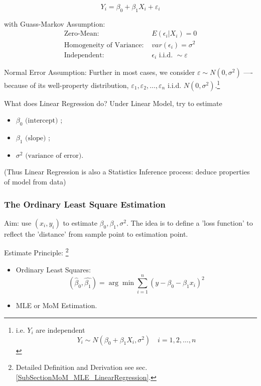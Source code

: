     \begin{equation}
        Y_i=\beta _0+\beta _1X_i+\varepsilon _i 
    \end{equation}

    with Guass-Markov Assumption:
    \begin{equation}\label{EqaGaussMarkovAssumption}
        \begin{aligned}
            \text{Zero-Mean: }&E(\epsilon_i|X_i)=0 \\
            \text{Homogeneity of Variance: }&var(\epsilon_i)=\sigma^2\\
            \text{Independent: }&\epsilon_i\text{ i.i.d. }\sim \varepsilon
        \end{aligned}
    \end{equation}
 
  

    Normal Error Assumption: Further in most cases, we consider $ \varepsilon \sim N(0,\sigma^2) $ ----because of its well-property distribution, $ \varepsilon _1,\varepsilon _2,\ldots,\varepsilon _n $ i.i.d. $ N(0,\sigma ^2) $.\footnote{i.e. $ Y_i $ are independent
    \begin{equation}
        Y_i\sim N(\beta _0+\beta _1X_i,\sigma^2)\quad i=1,2,\ldots ,n 
    \end{equation}
    
    }
        
    What does Linear Regression do? Under Linear Model, try to estimate 
    \begin{itemize}[topsep=0pt,itemsep=-2pt]
        \item $ \beta _0\text{ (intercept) }$;
        \item $\beta _1\text{ (slope) }$;
        \item $\sigma ^2\text{ (variance of error)} $.
    \end{itemize}
    
    
    (Thus Linear Regression is also a Statistics Inference process: deduce properties of model from data)
        
\subsubsection{The Ordinary Least Square Estimation}
    Aim: use $ (x_i,y_i) $  to estimate $ \beta _0,\beta _1,\sigma^2 $. The idea is to define a 'loss function' to reflect the 'distance' from sample point to estimation point.

    Estimate Principle: \footnote{Detailed Definition and Derivation see sec.\ref{SubSectionMoM_MLE_LinearRegression}.}
    \begin{itemize}[topsep=2pt,itemsep=2pt]
        \item Ordinary Least Squares:
        \begin{equation}
            (\hat{\beta  }_0,\hat{\beta _1})=\arg\min\sum_{i=1}^n (y-\beta _0-\beta _1x_i)^2
        \end{equation}
        \item MLE or MoM Estimation.
    \end{itemize}
    

